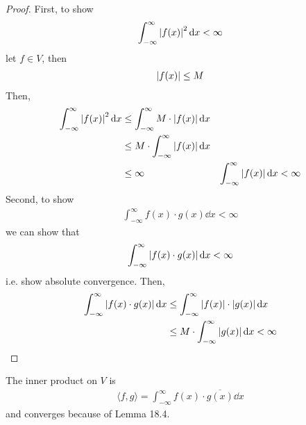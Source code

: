 \begin{proof}
    First, to show
    \begin{align}
        \int_{-\infty}^\infty \abs{f(x)}^2 \dd{x} < \infty
    \end{align}
    let $f \in V$, then
    \begin{align}
        \abs{f(x)} \le M
    \end{align}
    Then,
    \begin{align}
        \int_{-\infty}^\infty \abs{f(x)}^2 \dd{x} &\le \int_{-\infty}^\infty M \cdot \abs{f(x)} \dd{x}\\
        &\le M\cdot\int_{-\infty}^\infty \abs{f(x)} \dd{x}\\
        &\le \infty & \int_{-\infty}^\infty \abs{f(x)} \dd{x} < \infty
    \end{align}
    Second, to show
    \begin{align}
        \int_{-\infty}^\infty f(x)\cdot g(x) \dd{x} < \infty
    \end{align}
    we can show that
    \begin{align}
        \int_{-\infty}^\infty \abs{f(x)\cdot g(x)} \dd{x} < \infty
    \end{align}
    i.e. show absolute convergence. Then,
    \begin{align}
        \int_{-\infty}^\infty \abs{f(x)\cdot g(x)} \dd{x} &\le \int_{-\infty}^\infty \abs{f(x)} \cdot \abs{g(x)} \dd{x}\\
        &\le M \cdot \int_{-\infty}^\infty \abs{g(x)} \dd{x} < \infty
    \end{align}
\end{proof}
\begin{definition}
    The inner product on $V$ is
    \begin{align}
        \langle f, g \rangle = \int_{-\infty}^\infty f(x) \cdot \overline{g(x)} \dd{x}
    \end{align}
    and converges because of Lemma 18.4.
\end{definition}


